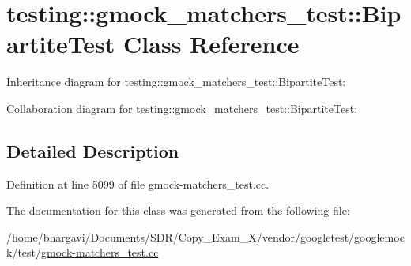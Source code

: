 \hypertarget{classtesting_1_1gmock__matchers__test_1_1_bipartite_test}{}\section{testing\+:\+:gmock\+\_\+matchers\+\_\+test\+:\+:Bipartite\+Test Class Reference}
\label{classtesting_1_1gmock__matchers__test_1_1_bipartite_test}


Inheritance diagram for testing\+:\+:gmock\+\_\+matchers\+\_\+test\+:\+:Bipartite\+Test\+:


Collaboration diagram for testing\+:\+:gmock\+\_\+matchers\+\_\+test\+:\+:Bipartite\+Test\+:


\subsection{Detailed Description}


Definition at line 5099 of file gmock-\/matchers\+\_\+test.\+cc.



The documentation for this class was generated from the following file\+:\begin{DoxyCompactItemize}
\item 
/home/bhargavi/\+Documents/\+S\+D\+R/\+Copy\+\_\+\+Exam\+\_\+X/vendor/googletest/googlemock/test/\hyperlink{gmock-matchers__test_8cc}{gmock-\/matchers\+\_\+test.\+cc}\end{DoxyCompactItemize}
